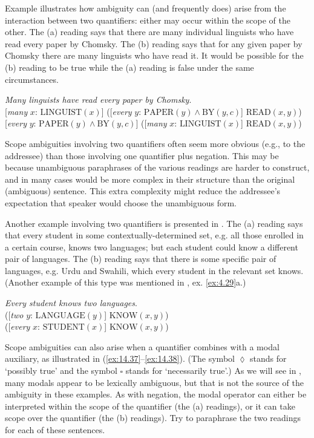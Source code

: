 Example  illustrates how ambiguity can (and frequently does) arise from the interaction between two quantifiers: either may occur within the scope of the other. The (a) reading says that there are many individual linguists who have read every paper by Chomsky. The (b) reading says that for any given paper by Chomsky there are many linguists who have read it. It would be possible for the (b) reading to be true while the (a) reading is false under the same circumstances.


\ea \label{ex:14.35}
\textit{Many linguists have read every paper by Chomsky}.\\
\ea{}  [\textit{many} $x$: $\text{LINGUIST}(x)$] ([\textit{every} $y$: $\text{PAPER}(y) \wedge \text{BY}(y,c)$] $\text{READ}(x,y)$)\\
\ex{}  [\textit{every} $y$: $\text{PAPER}(y) \wedge \text{BY}(y,c)$] ([\textit{many} $x$: $\text{LINGUIST}(x)$] $\text{READ}(x,y)$)
                       \z
\z


Scope ambiguities involving two quantifiers often seem more obvious (e.g., to the addressee) than those involving one quantifier plus negation. This may be because unambiguous paraphrases of the various readings are harder to construct, and in many cases would be more complex in their structure than the original (ambiguous) sentence. This extra complexity might reduce the addressee's expectation that speaker would choose the unambiguous form.


Another example involving two quantifiers is presented in . The (a) reading says that every student in some contextually-determined set, e.g. all those enrolled in a certain course, knows two languages; but each student could know a different pair of languages. The (b) reading says that there is some specific pair of languages, e.g.  Urdu and  Swahili, which every student in the relevant set knows. (Another example of this type was mentioned in , ex. \ref{ex:4.29}a.)


\ea \label{ex:14.36}
\textit{Every student knows two languages}.\\
 ([\textit{two} $y$:  $\text{LANGUAGE}(y)$] $\text{KNOW}(x, y)$)\\
 ([\textit{every} $x$: $\text{STUDENT}(x)$] $\text{KNOW}(x, y)$)
   \z
\z


Scope ambiguities can also arise when a quantifier combines with a modal auxiliary, as illustrated in (\ref{ex:14.37}--\ref{ex:14.38}). (The symbol ${\lozenge}$ stands for ‘possibly true’ and the symbol ${\square}$ stands for ‘necessarily true’.) As we will see in , many modals appear to be lexically ambiguous, but that is not the source of the ambiguity in these examples. As with negation, the modal operator can either be interpreted within the scope of the quantifier (the (a) readings), or it can take scope over the quantifier (the (b) readings). Try to paraphrase the two readings for each of these sentences.


